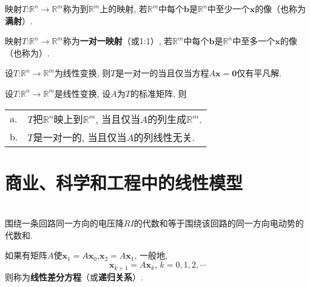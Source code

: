 \begin{definition}
映射$T$:$\mathbb{R}^n\rightarrow\mathbb{R}^m$称为到$\mathbb{R}^m$上的映射, 若$\mathbb{R}^m$中每个$\bm{b}$是$\mathbb{R}^n$中至少一个$\bm{x}$的像（也称为\textbf{满射}）.
\end{definition}\vspace{4ex}

\begin{definition}
映射$T$:$\mathbb{R}^n\rightarrow\mathbb{R}^m$称为\textbf{一对一映射}（或1:1）, 若$\mathbb{R}^m$中每个$\bm{b}$是$\mathbb{R}^n$中至多一个$\bm{x}$的像（也称为）.
\end{definition}\vspace{4ex}

\begin{TheoremOne}
设$T$:$\mathbb{R}^n\rightarrow\mathbb{R}^m$为线性变换, 则$T$是一对一的当且仅当方程$A\bm{x}=\bm{0}$仅有平凡解.
\end{TheoremOne}\vspace{4ex}

\begin{TheoremOne}
设$T$:$\mathbb{R}^n\rightarrow\mathbb{R}^m$是线性变换, 设$A$为$T$的标准矩阵, 则\\
\begin{tabular}{l@{\ }l}
a. & $T$把$\mathbb{R}^n$映上到$\mathbb{R}^m$, 当且仅当$A$的列生成$\mathbb{R}^m$.\\
b. & $T$是一对一的, 当且仅当$A$的列线性无关.
\end{tabular}
\end{TheoremOne}\vspace{6ex}

\section{商业、科学和工程中的线性模型}
\begin{law}[基尔霍夫电压定律]\ \\
围绕一条回路同一方向的电压降$RI$的代数和等于围绕该回路的同一方向电动势的代数和.
\end{law}\vspace{4ex}

\begin{law}
如果有矩阵$A$使$\bm{x}_1=A\bm{x}_0$,$\bm{x}_2=A\bm{x}_1$, 一般地,
\[\bm{x}_{k+1}=A\bm{x}_k\text{,\ }k=0,1,2,\cdots\]
则称为\textbf{线性差分方程}（或\textbf{递归关系}）.
\end{law}
